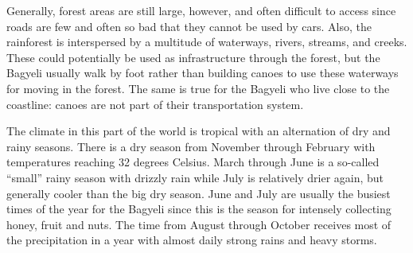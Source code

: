 Generally, forest areas are still large, however, and often difficult to access since roads are few and often so bad that they cannot be used by cars. Also, the rainforest is interspersed by a multitude of waterways, rivers, streams, and creeks. These could potentially be used as infrastructure through the forest, but the Bagyeli usually walk by foot rather than building canoes to use these waterways for moving in the forest. The same is true for the Bagyeli who live close to the coastline: canoes are not part of their transportation system.

The climate in this part of the world is tropical with an alternation of dry and rainy seasons. There is a dry season from November through February with temperatures reaching 32 degrees Celsius. March through June is a so-called ``small'' rainy season with drizzly rain while July is relatively drier again, but generally cooler than the big dry season. June and July are usually the busiest times of the year for the Bagyeli since this is the season for intensely collecting honey, fruit and nuts. The time from August through October receives most of the precipitation in a year with almost daily strong rains and heavy storms.



